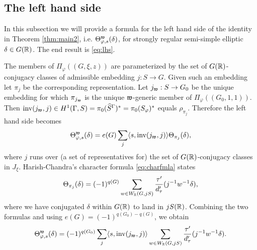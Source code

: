 \documentclass{article}
\theoremstyle{definition}
\numberwithin{equation}{section}
\renewcommand{\-}{\hyp{}}
\begin{document}
\subsection{The left hand side}



In this subsection we will provide a formula for the left hand side of the identity in Theorem \ref{thm:main2}, i.e. $\Theta^{\mathfrak{w}}_{\varphi,s}(\delta)$, for strongly regular semi-simple elliptic $\delta \in G(\mathbb{R})$. The end result is \eqref{eq:lhs}.

The members of $\Pi_\varphi((G,\xi,z))$ are parameterized by the set of $G(\mathbb{R})$-conjugacy classes of admissible embedding $j : S \to G$. Given such an embedding let $\pi_j$ be the corresponding representation. Let $j_{\mathfrak{w}} : S \to G_0$ be the unique embedding for which $\pi_{j_{\mathfrak{w}}}$ is the unique $\mathfrak{w}$-generic member of $\Pi_\varphi((G_0,1,1))$. Then $\textrm{inv}(j_{\mathfrak{w}},j) \in H^1(\Gamma,S)=\pi_0(\widehat S^\Gamma)^*=\pi_0(S_\varphi)^*$ equals $\rho_{\pi_j}$. Therefore the left hand side becomes
\[ \Theta^{\mathfrak{w}}_{\varphi,s}(\delta)=e(G)\sum_j \langle s,\textrm{inv}(j_{\mathfrak{w}},j)\rangle\Theta_{\pi_j}(\delta), \]
where $j$ runs over (a set of representatives for) the set of $G(\mathbb{R})$-conjugacy classes in $J_\xi$. Harish-Chandra's character formula \eqref{eq:charfmla} states
\[ \Theta_{\pi_j}(\delta) = (-1)^{q(G)}\sum_{w \in W_{\mathbb{R}}(G,jS)}\frac{\tau'}{d_\tau'}(j^{-1}w^{-1}\delta),\]
where we have conjugated $\delta$ within $G(\mathbb{R})$ to land in $jS(\mathbb{R})$. Combining the two formulas and using $e(G)=(-1)^{q(G_0)-q(G)}$, we obtain
\[ \Theta^{\mathfrak{w}}_{\varphi,s}(\delta) = (-1)^{q(G_0)} \sum_j \langle s,\textrm{inv}(j_{\mathfrak{w}},j)\rangle \sum_{w \in W_{\mathbb{R}}(G,jS)}\frac{\tau'}{d_\tau'}(j^{-1}w^{-1}\delta). \]
\end{document}
